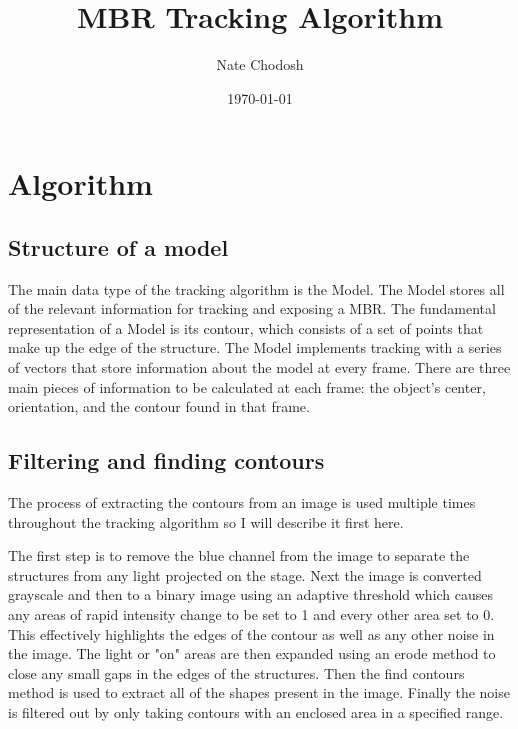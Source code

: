 \documentclass[11pt]{article}
\author{Nate Chodosh}
\date{\today}
\title{MBR Tracking Algorithm}
\begin{document}
\maketitle

\section{Algorithm}
\label{sec-1}

\subsection{Structure of a model}
\label{sec-1-1}

The main data type of the tracking algorithm is the
Model. The Model stores all of the relevant information for tracking
and exposing a MBR. The fundamental representation of a Model is its
contour, which consists of a set of points that make up the edge of
the structure. The Model implements tracking with a
series of vectors that store information about the model at every
frame. There are three main pieces of information to be calculated
at each frame: the object's center, orientation, and the contour
found in that frame.

\subsection{Filtering and finding contours}
\label{sec-1-2}

The process of extracting the contours from an image is used
multiple times throughout the tracking algorithm so I will describe
it first here.

The first step is to remove the blue channel from the image to
separate the structures from any light projected
on the stage. Next the image is converted grayscale and then to a binary image using
an adaptive threshold which causes any areas of rapid intensity
change to be set to 1 and every other area set to 0. This
effectively highlights the edges of the contour as well as any
other noise in the image. The light or "on" areas are then expanded
using an erode method to close any small gaps in the edges of the
structures. Then the find contours method is used to extract all of
the shapes present in the image. Finally the noise is filtered out by
only taking contours with an enclosed area in a specified range.
\end{document}
